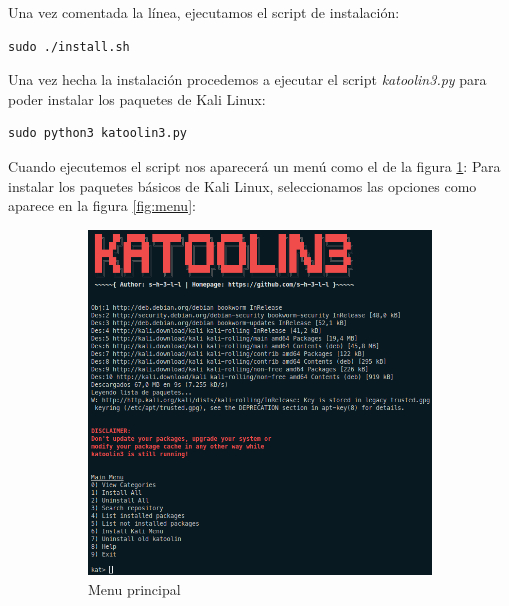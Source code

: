 \documentclass[11pt]{report}
\begin{document}
Una vez comentada la línea, ejecutamos el script de instalación:
\begin{BVerbatim}
sudo ./install.sh
\end{BVerbatim}

Una vez hecha la instalación procedemos a ejecutar el script \emph{katoolin3.py} para poder instalar los paquetes de Kali Linux:
\begin{BVerbatim}
sudo python3 katoolin3.py
\end{BVerbatim}

Cuando ejecutemos el script nos aparecerá un menú como el de la figura \ref{fig:menu principal}:
Para instalar los paquetes básicos de Kali Linux, seleccionamos las opciones como aparece en la figura \ref{fig:menu}:

\begin{figure}[H]
  \begin{subfigure}{0.5\textwidth}
    \centering
    \includegraphics[scale=0.345]{img/menu.png}
    \caption{Menu principal}
    \label{fig:menu principal}
  \end{subfigure}%
  \begin{subfigure}{0.5\textwidth}
    \centering

\end{subfigure}
\end{figure}
\end{document}
